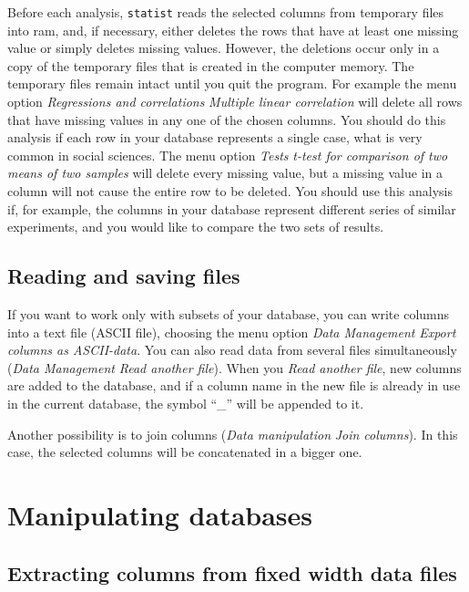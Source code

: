 \documentclass[12pt,english]{article}
\newcommand{\st}{{\tt sta\-tist} }
\begin{document}
Before each analysis, \st reads the selected columns from
temporary files into ram, and, if necessary, either deletes
the rows that have at least one missing value or simply
deletes missing values. However, the deletions occur only in
a copy of the temporary files that is created in the
computer memory.  The temporary files remain intact until
you quit the program. For example the menu option {\em
Regressions and correlations} {\textbar} {\em Multiple linear correlation}
will delete all rows that have missing values in any one of
the chosen columns. You should do this analysis if each row
in your database represents a single case, what is very
common in social sciences. The menu option {\em Tests}
{\textbar} {\em t-test for comparison of two means of two samples} will
delete every missing value, but a missing value in a column
will not cause the entire row to be deleted. You should use
this analysis if, for example, the columns in your database
represent different series of similar experiments, and you
would like to compare the two sets of results.

\subsection{Reading and saving files}

If you want to work only with subsets of your database, you
can write columns into a text file (ASCII file), choosing
the menu option {\em Data Management} {\textbar} {\em Export columns as
ASCII-data}. You can also read data from several files
simultaneously ({\em Data Management} {\textbar} {\em Read another file}).
When you {\em Read another file}, new columns are added to
the database, and if a column name in the new file is
already in use in the current database, the symbol ``\_''
will be appended to it.

Another possibility is to join columns ({\em Data
manipulation} {\textbar} {\em Join columns}). In this case, the selected
columns will be concatenated in a bigger one.

\section{Manipulating databases}

\subsection{Extracting columns from fixed width data files}
\end{document}

